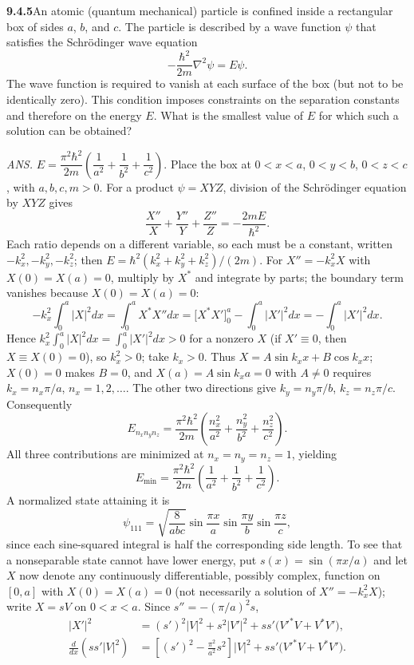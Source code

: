 \par\bigskip
\noindent\textbf{9.4.5}\quad An atomic (quantum mechanical) particle is
confined inside a rectangular box of sides $a$, $b$, and $c$. The particle is
described by a wave function $\psi$ that satisfies the Schr\"odinger wave
equation
\[
-\frac{\hbar^{2}}{2m}\nabla^{2}\psi=E\psi.
\]
The wave function is required to vanish at each surface of the box (but not to
be identically zero). This condition imposes constraints on the separation
constants and therefore on the energy $E$. What is the smallest value of $E$
for which such a solution can be obtained?
\par\nobreak\hfill\emph{ANS.}\enspace
$E=\dfrac{\pi^{2}\hbar^{2}}{2m}\left(\dfrac{1}{a^{2}}+\dfrac{1}{b^{2}}
+\dfrac{1}{c^{2}}\right)$.
\solution
Place the box at $0<x<a$, $0<y<b$, $0<z<c$, with $a,b,c,m>0$.
For a product $\psi=XYZ$, division of the Schr\"odinger equation by
$XYZ$ gives
\[
\frac{X''}X+\frac{Y''}Y+\frac{Z''}Z=-\frac{2mE}{\hbar^2}.
\]
Each ratio depends on a different variable, so each must be a constant,
written $-k_x^2,-k_y^2,-k_z^2$; then
$E=\hbar^2(k_x^2+k_y^2+k_z^2)/(2m)$.
For $X''=-k_x^2X$ with $X(0)=X(a)=0$, multiply by $X^*$ and integrate
by parts; the boundary term vanishes because $X(0)=X(a)=0$:
\[
-k_x^2\int_0^a|X|^2dx=\int_0^aX^*X''dx
=\bigl[X^*X'\bigr]_0^a-\int_0^a|X'|^2dx=-\int_0^a|X'|^2dx.
\]
Hence $k_x^2\int_0^a|X|^2dx=\int_0^a|X'|^2dx>0$ for a nonzero $X$
(if $X'\equiv0$, then $X\equiv X(0)=0$), so $k_x^2>0$; take $k_x>0$.
Thus $X=A\sin k_xx+B\cos k_xx$;
$X(0)=0$ makes $B=0$, and $X(a)=A\sin k_xa=0$ with $A\ne0$ requires
$k_x=n_x\pi/a$, $n_x=1,2,\ldots$.  The other two directions give
$k_y=n_y\pi/b$, $k_z=n_z\pi/c$.  Consequently
\[
E_{n_xn_yn_z}=\frac{\pi^2\hbar^2}{2m}
\left(\frac{n_x^2}{a^2}+\frac{n_y^2}{b^2}+\frac{n_z^2}{c^2}\right).
\]
All three contributions are minimized at $n_x=n_y=n_z=1$, yielding
\[
\boxed{E_{\min}=\frac{\pi^2\hbar^2}{2m}
\left(\frac1{a^2}+\frac1{b^2}+\frac1{c^2}\right)}.
\]
A normalized state attaining it is
\[
\psi_{111}=\sqrt{\frac8{abc}}
\sin\frac{\pi x}a\sin\frac{\pi y}b\sin\frac{\pi z}c,
\]
since each sine-squared integral is half the corresponding side length.
To see that a nonseparable state cannot have lower energy, put
$s(x)=\sin(\pi x/a)$ and let $X$ now denote any continuously
differentiable, possibly complex, function on $[0,a]$ with
$X(0)=X(a)=0$ (not necessarily a solution of $X''=-k_x^2X$); write
$X=sV$ on $0<x<a$.  Since $s''=-(\pi/a)^2s$,
\begin{align*}
|X'|^2&=(s')^2|V|^2+s^2|V'|^2
       +ss'\bigl(V'^*V+V^*V'\bigr),\\
\frac{d}{dx}(ss'|V|^2)
&=\left[(s')^2-\frac{\pi^2}{a^2}s^2\right]|V|^2
  +ss'\bigl(V'^*V+V^*V'\bigr).
\end{align*}
